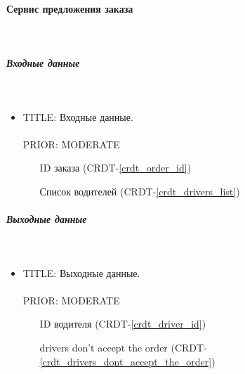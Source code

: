 \paragraph{Сервис предложения заказа} \mbox{} \\ \label{order_offering_service}

    \subparagraph{Входные данные} \mbox{} \\ \label{}

      \begin{itemize}

        \item{

          TITLE: Входные данные.\\
          \\
          PRIOR: MODERATE\\

        }

        \begin{itemize}
          \item [ID заказа] (CRDT-\ref{crdt_order_id})
          \item [Список водителей] (CRDT-\ref{crdt_drivers_list})
        \end{itemize}

      \end{itemize}

    \subparagraph{Выходные данные} \mbox{} \\

      \begin{itemize}

        \item{

          TITLE: Выходные данные.\\
          \\
          PRIOR: MODERATE\\

        }

        \begin{itemize}
          \item [ID водителя] (CRDT-\ref{crdt_driver_id})
          \item [drivers don't accept the order] (CRDT-\ref{crdt_drivers_dont_accept_the_order})
        \end{itemize}

      \end{itemize}

